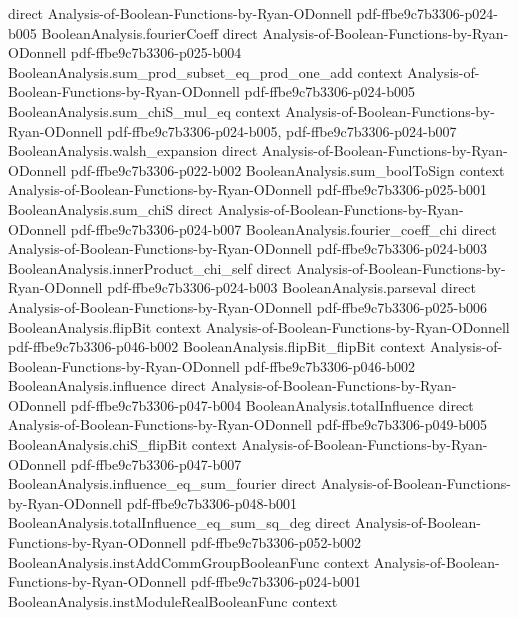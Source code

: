 \begin{lemma}
  {direct}
  {Analysis-of-Boolean-Functions-by-Ryan-ODonnell}
  {pdf-ffbe9c7b3306-p024-b005}
\proofstep
  {BooleanAnalysis.fourierCoeff}
  {direct}
  {Analysis-of-Boolean-Functions-by-Ryan-ODonnell}
  {pdf-ffbe9c7b3306-p025-b004}
\proofstep
  {BooleanAnalysis.sum_prod_subset_eq_prod_one_add}
  {context}
  {Analysis-of-Boolean-Functions-by-Ryan-ODonnell}
  {pdf-ffbe9c7b3306-p024-b005}
\proofstep
  {BooleanAnalysis.sum_chiS_mul_eq}
  {context}
  {Analysis-of-Boolean-Functions-by-Ryan-ODonnell}
  {pdf-ffbe9c7b3306-p024-b005,
    pdf-ffbe9c7b3306-p024-b007}
\proofstep
  {BooleanAnalysis.walsh_expansion}
  {direct}
  {Analysis-of-Boolean-Functions-by-Ryan-ODonnell}
  {pdf-ffbe9c7b3306-p022-b002}
\proofstep
  {BooleanAnalysis.sum_boolToSign}
  {context}
  {Analysis-of-Boolean-Functions-by-Ryan-ODonnell}
  {pdf-ffbe9c7b3306-p025-b001}
\proofstep
  {BooleanAnalysis.sum_chiS}
  {direct}
  {Analysis-of-Boolean-Functions-by-Ryan-ODonnell}
  {pdf-ffbe9c7b3306-p024-b007}
\proofstep
  {BooleanAnalysis.fourier_coeff_chi}
  {direct}
  {Analysis-of-Boolean-Functions-by-Ryan-ODonnell}
  {pdf-ffbe9c7b3306-p024-b003}
\proofstep
  {BooleanAnalysis.innerProduct_chi_self}
  {direct}
  {Analysis-of-Boolean-Functions-by-Ryan-ODonnell}
  {pdf-ffbe9c7b3306-p024-b003}
\proofstep
  {BooleanAnalysis.parseval}
  {direct}
  {Analysis-of-Boolean-Functions-by-Ryan-ODonnell}
  {pdf-ffbe9c7b3306-p025-b006}
\proofstep
  {BooleanAnalysis.flipBit}
  {context}
  {Analysis-of-Boolean-Functions-by-Ryan-ODonnell}
  {pdf-ffbe9c7b3306-p046-b002}
\proofstep
  {BooleanAnalysis.flipBit_flipBit}
  {context}
  {Analysis-of-Boolean-Functions-by-Ryan-ODonnell}
  {pdf-ffbe9c7b3306-p046-b002}
\proofstep
  {BooleanAnalysis.influence}
  {direct}
  {Analysis-of-Boolean-Functions-by-Ryan-ODonnell}
  {pdf-ffbe9c7b3306-p047-b004}
\proofstep
  {BooleanAnalysis.totalInfluence}
  {direct}
  {Analysis-of-Boolean-Functions-by-Ryan-ODonnell}
  {pdf-ffbe9c7b3306-p049-b005}
\proofstep
  {BooleanAnalysis.chiS_flipBit}
  {context}
  {Analysis-of-Boolean-Functions-by-Ryan-ODonnell}
  {pdf-ffbe9c7b3306-p047-b007}
\proofstep
  {BooleanAnalysis.influence_eq_sum_fourier}
  {direct}
  {Analysis-of-Boolean-Functions-by-Ryan-ODonnell}
  {pdf-ffbe9c7b3306-p048-b001}
\proofstep
  {BooleanAnalysis.totalInfluence_eq_sum_sq_deg}
  {direct}
  {Analysis-of-Boolean-Functions-by-Ryan-ODonnell}
  {pdf-ffbe9c7b3306-p052-b002}
\proofstep
  {BooleanAnalysis.instAddCommGroupBooleanFunc}
  {context}
  {Analysis-of-Boolean-Functions-by-Ryan-ODonnell}
  {pdf-ffbe9c7b3306-p024-b001}
\proofstep
  {BooleanAnalysis.instModuleRealBooleanFunc}
  {context}

\end{lemma}

